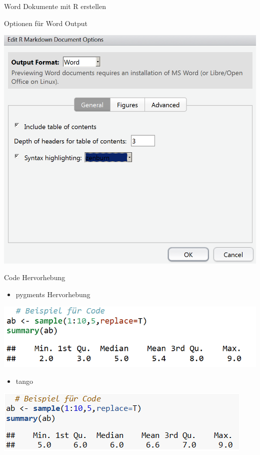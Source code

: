 \documentclass[ignorenonframetext,]{beamer}
\providecommand{\tightlist}{%
\setlength{\itemsep}{0pt}\setlength{\parskip}{0pt}}
\begin{document}
\begin{frame}[fragile]{Word Dokumente mit R erstellen}
\begin{block}{Optionen für Word Output}

\includegraphics{./tex2pdf.9796/72a16d74da4290258d030c58c103f0f7a00fa061.png}

\end{block}

\begin{block}{Code Hervorhebung}

\begin{itemize}
\tightlist
\item
  pygments Hervorhebung
\end{itemize}

\includegraphics{./tex2pdf.9796/341b9304cd9e3c59671fa5aee5f31f34da0c70ab.png}

\begin{itemize}
\tightlist
\item
  tango
\end{itemize}

\includegraphics{./tex2pdf.9796/f668e6672d8e4bcb15dee6d48d3d8e859a0bb2f1.png}


\end{block}
\end{frame}
\end{document}
